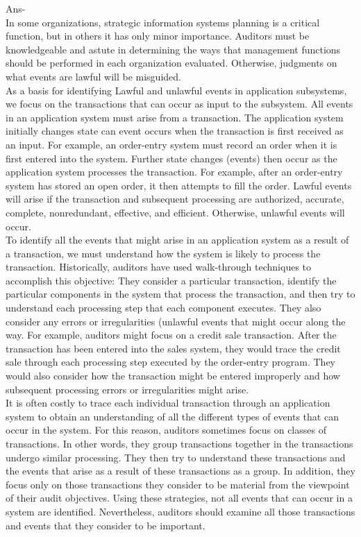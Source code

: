 \documentclass[12pt]{article}
\begin{document}
Ans-\\
In some organizations, strategic information systems planning is a critical function, but in others it has only minor importance. Auditors must be knowledgeable and astute in determining the ways that management functions should be performed in each organization evaluated. Otherwise, judgments on what events are lawful will be misguided.
\\
As a basis for identifying Lawful and unlawful events in application subsystems, we focus on the transactions that can occur as input to the subsystem. All events in an application system must arise from a transaction. The application system initially changes state can event occurs when the transaction is first received as an input. For example, an order-entry system must record an order when it is first entered into the system. Further state changes (events) then occur as the application system processes the transaction. For example, after an order-entry system has stored an open order, it then attempts to fill the order. Lawful events will arise if the transaction and subsequent processing are authorized, accurate, complete, nonredundant, effective, and efficient. Otherwise, unlawful events will occur.
\\
To identify all the events that might arise in an application system as a result of a transaction, we must understand how the system is likely to process the transaction. Historically, auditors have used walk-through techniques to accomplish this objective: They consider a particular transaction, identify the particular components in the system that process the transaction, and then try to understand each processing step that each component executes. They also consider any errors or irregularities (unlawful events that might occur along the way. For example, auditors might focus on a credit sale transaction. After the transaction has been entered into the sales system, they would trace the credit sale through each processing step executed by the order-entry program. They would also consider how the transaction might be entered improperly and how subsequent processing errors or irregularities might arise.
\\
It is often costly to trace each individual transaction through an application system to obtain an understanding of all the different types of events that can occur in the system. For this reason, auditors sometimes focus on classes of transactions. In other words, they group transactions together in the transactions undergo similar processing. They then try to understand these transactions and the events that arise as a result of these transactions as a group. In addition, they focus only on those transactions they consider to be material from the viewpoint of their audit objectives. Using these strategies, not all events that can occur in a system are identified. Nevertheless, auditors should examine all those transactions and events that they consider to be important.
\end{document}
